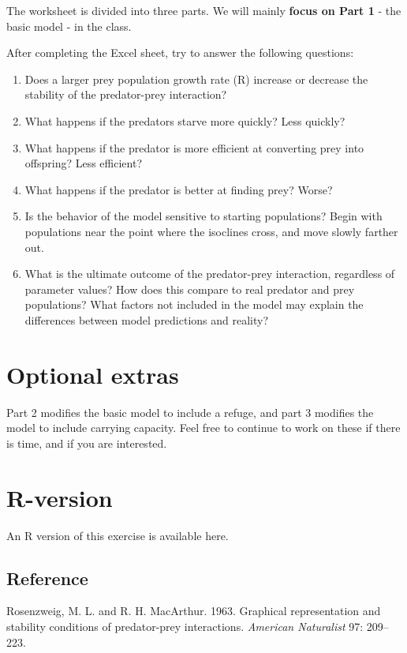 \documentclass[
  a4paper]{book}
\providecommand{\tightlist}{%
  \setlength{\itemsep}{0pt}\setlength{\parskip}{0pt}}
\begin{document}
The worksheet is divided into three parts. We will mainly \textbf{focus on Part 1} - the basic model - in the class.

After completing the Excel sheet, try to answer the following questions:

\begin{enumerate}
\def\labelenumi{\arabic{enumi}.}
\tightlist
\item
  Does a larger prey population growth rate (R) increase or decrease the stability of the predator-prey interaction?
\item
  What happens if the predators starve more quickly? Less quickly?
\item
  What happens if the predator is more efficient at converting prey into offspring? Less efficient?
\item
  What happens if the predator is better at finding prey? Worse?
\item
  Is the behavior of the model sensitive to starting populations? Begin with populations near the point where the isoclines cross, and move slowly farther out.
\item
  What is the ultimate outcome of the predator-prey interaction, regardless of parameter values? How does this compare to real predator and prey populations? What factors not included in the model may explain the differences between model predictions and reality?
\end{enumerate}

\section{Optional extras}\label{optional-extras}

Part 2 modifies the basic model to include a refuge, and part 3 modifies the model to include carrying capacity. Feel free to continue to work on these if there is time, and if you are interested.

\section{R-version}\label{r-version}

An R version of this exercise is available here.

\subsection{Reference}\label{reference}

Rosenzweig, M. L. and R. H. MacArthur. 1963. Graphical representation and stability conditions of predator-prey interactions. \emph{American Naturalist} 97: 209--223.
\end{document}
